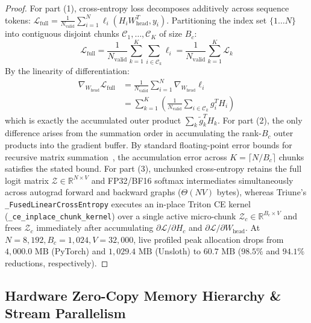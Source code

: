 \documentclass[10pt,twocolumn,letterpaper]{article}
\begin{document}
\begin{proof}
For part (1), cross-entropy loss decomposes additively across sequence tokens: $\mathcal{L}_{\text{full}} = \frac{1}{N_{\text{valid}}} \sum_{i=1}^N \ell_i(H_i W_{\text{head}}^T, y_i)$. Partitioning the index set $\{1 \dots N\}$ into contiguous disjoint chunks $\mathcal{C}_1, \dots, \mathcal{C}_K$ of size $B_c$:
\begin{equation}
    \mathcal{L}_{\text{full}} = \frac{1}{N_{\text{valid}}} \sum_{k=1}^K \sum_{i \in \mathcal{C}_k} \ell_i = \frac{1}{N_{\text{valid}}} \sum_{k=1}^K \mathcal{L}_k
\end{equation}
By the linearity of differentiation:
\begin{equation}
\begin{aligned}
    \nabla_{W_{\text{head}}} \mathcal{L}_{\text{full}} &= \frac{1}{N_{\text{valid}}} \sum_{i=1}^N \nabla_{W_{\text{head}}} \ell_i \\
    &= \sum_{k=1}^K \left( \frac{1}{N_{\text{valid}}} \sum_{i \in \mathcal{C}_k} g_i^T H_i \right)
\end{aligned}
\end{equation}
which is exactly the accumulated outer product $\sum_k \tilde{g}_k^T H_k$.
For part (2), the only difference arises from the summation order in accumulating the rank-$B_c$ outer products into the gradient buffer. By standard floating-point error bounds for recursive matrix summation~\cite{golub2013matrix}, the accumulation error across $K = \lceil N / B_c \rceil$ chunks satisfies the stated bound.
For part (3), unchunked cross-entropy retains the full logit matrix $\mathcal{Z} \in \mathbb{R}^{N \times V}$ and FP32/BF16 softmax intermediates simultaneously across autograd forward and backward graphs ($\Theta(NV)$ bytes), whereas Triune's \texttt{\_FusedLinearCrossEntropy} executes an in-place Triton CE kernel (\texttt{\_ce\_inplace\_chunk\_kernel}) over a single active micro-chunk $\mathcal{Z}_c \in \mathbb{R}^{B_c \times V}$ and frees $\mathcal{Z}_c$ immediately after accumulating $\partial \mathcal{L} / \partial H_c$ and $\partial \mathcal{L} / \partial W_{\text{head}}$. At $N=8,192, B_c=1,024, V=32,000$, live profiled peak allocation drops from $4,000.0\text{ MB}$ (PyTorch) and $1,029.4\text{ MB}$ (Unsloth) to $60.7\text{ MB}$ ($98.5\%$ and $94.1\%$ reductions, respectively).
\end{proof}

\subsection{Hardware Zero-Copy Memory Hierarchy \& Stream Parallelism}
\end{document}
